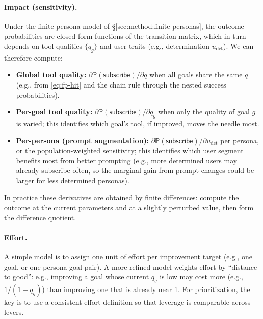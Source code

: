 \paragraph{Impact (sensitivity).}
Under the finite-persona model of \S\ref{sec:method:finite-personas}, the outcome probabilities are closed-form functions of the transition matrix, which in turn depends on tool qualities $\{q_g\}$ and user traits (e.g., determination $u_{\mathrm{det}}$). We can therefore compute:
\begin{itemize}
  \item \textbf{Global tool quality:} $\partial \mathbb{P}(\mathsf{subscribe}) / \partial q$ when all goals share the same $q$ (e.g., from \eqref{eq:fp-hit} and the chain rule through the nested success probabilities).
  \item \textbf{Per-goal tool quality:} $\partial \mathbb{P}(\mathsf{subscribe}) / \partial q_g$ when only the quality of goal $g$ is varied; this identifies which goal's tool, if improved, moves the needle most.
  \item \textbf{Per-persona (prompt augmentation):} $\partial \mathbb{P}(\mathsf{subscribe}) / \partial u_{\mathrm{det}}$ per persona, or the population-weighted sensitivity; this identifies which user segment benefits most from better prompting (e.g., more determined users may already subscribe often, so the marginal gain from prompt changes could be larger for less determined personas).
\end{itemize}
In practice these derivatives are obtained by finite differences: compute the outcome at the current parameters and at a slightly perturbed value, then form the difference quotient.

\paragraph{Effort.}
A simple model is to assign one unit of effort per improvement target (e.g., one goal, or one persona-goal pair). A more refined model weights effort by ``distance to good'': e.g., improving a goal whose current $q_g$ is low may cost more (e.g., $1 / (1 - q_g)$) than improving one that is already near 1. For prioritization, the key is to use a consistent effort definition so that leverage is comparable across levers.

